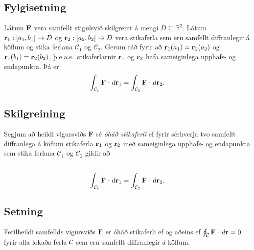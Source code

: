 \documentclass[a4paper,10pt,icelandic]{sphinxmanual}
\begin{document}
\subsection{Fylgisetning}
\label{Kafli5:id11}
Látum \(\mbox{${\bf F}$}\) vera samfellt stigulsvið skilgreint á
mengi \(D\subseteq {\mathbb  R}^2\). Látum
\(\mbox{${\bf r}$}_1:[a_1,b_1]\rightarrow D\) og
\(\mbox{${\bf r}$}_2:[a_2,b_2]\rightarrow D\) vera stikaferla sem
eru samfellt diffranlegir á köflum og stika ferlana
\(\mathcal{C}_1\) og \(\mathcal{C}_2\). Gerum ráð fyrir að
\(\mbox{${\bf r}$}_1(a_1)=\mbox{${\bf r}$}_2(a_2)\) og
\(\mbox{${\bf r}$}_1(b_1)=\mbox{${\bf r}$}_2(b_2)\),
þ.e.a.s. stikaferlarnir \(\mbox{${\bf r}$}_1\) og
\(\mbox{${\bf r}$}_2\) hafa sameiginlega upphafs- og endapunkta. Þá
er
\begin{gather}
\begin{split}\displaystyle \int_{{\cal C}_1} \mbox{${\bf F}$}\cdot\,d\mbox{${\bf r}$}_1=\int_{{\cal C}_2} \mbox{${\bf F}$}\cdot\,d\mbox{${\bf r}$}_2.\end{split}\notag
\end{gather}

\subsection{Skilgreining}
\label{Kafli5:id12}
Segjum að heildi vigursviðs \(\mbox{${\bf F}$}\) sé \emph{óháð
stikaferli} ef fyrir sérhverja tvo samfellt diffranlega á köflum
stikaferla \(\mbox{${\bf r}$}_1\) og \(\mbox{${\bf r}$}_2\) með
sameiginlega upphafs- og endapunkta sem stika ferlana
\(\mathcal{C}_1\) og \(\mathcal{C}_2\) gildir að
\begin{gather}
\begin{split}\displaystyle\end{split}\notag\\\begin{split}\int_{{\cal C}_1} \mbox{${\bf F}$}\cdot\,d\mbox{${\bf r}$}_1=
\int_{{\cal C}_2} \mbox{${\bf F}$}\cdot\,d\mbox{${\bf r}$}_2.\end{split}\notag
\end{gather}

\subsection{Setning}
\label{Kafli5:id13}
Ferilheildi samfellds vigursviðs \(\mbox{${\bf F}$}\) er óháð
stikaferli ef og aðeins ef
\(\oint_{\cal C} \mbox{${\bf F}$}\cdot\,d\mbox{${\bf r}$}=0\) fyrir
alla lokaða ferla \(\cal C\) sem eru samfellt diffranlegir á köflum.
\end{document}
